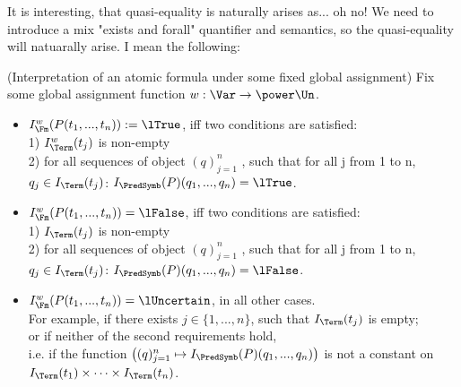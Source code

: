 It is interesting, that quasi-equality is naturally arises as... oh no!
We need to introduce a mix "exists and forall" quantifier and semantics, so the quasi-equality will natuarally arise.
I mean the following:


\begin{definition}(Interpretation of an atomic formula under some fixed global assignment)
Fix some global assignment function $w:\Var\to\power\Un$.\\


\begin{itemize}
\item
$I_\Fm^w(P(t_1,...,t_n)):=\lTrue$, iff two conditions are satisfied:\\
1) $I^w_\Term(t_j)$ is non-empty\\
2) for all sequences of object $(q)_{j=1}^n$ , such that for all j from 1 to n, $q_j\in I_\Term(t_j)$: $I_{\PredSymb}(P)(q_1,...,q_n)=\lTrue$.
\item $I_\Fm^w(P(t_1,...,t_n))=\lFalse$, iff two conditions are satisfied:\\
1) $I_\Term(t_j)$ is non-empty\\
2) for all sequences of object $(q)_{j=1}^n$ , such that for all j from 1 to n, $q_j\in I_\Term(t_j)$: $I_{\PredSymb}(P)(q_1,...,q_n)=\lFalse$.
\item
$I_\Fm^w(P(t_1,...,t_n))=\lUncertain$, in all other cases.\\
For example, if there exists $j\in\{1,...,n\}$, such that $I_\Term(t_j)$ is empty;\\
or if neither of the second requirements hold,\\
i.e. if the function $\left((q)_{j=1}^n \mapsto I_{\PredSymb}(P)(q_1,...,q_n)\right)$ is not a constant on $I_\Term(t_1)\times\dots\times I_\Term(t_n)$.
\end{itemize}
\end{definition}





